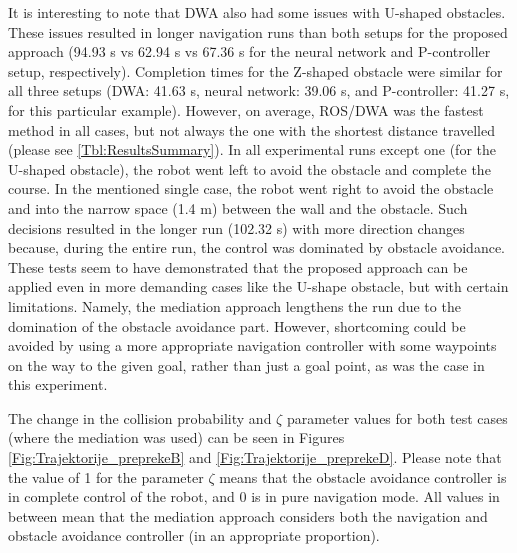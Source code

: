 It is interesting to note that DWA also had some issues with U-shaped obstacles. These issues resulted in longer navigation runs than both setups for the proposed approach (94.93 s vs 62.94 s vs 67.36 s for the neural network and P-controller setup, respectively). Completion times for the Z-shaped obstacle were similar for all three setups (DWA: 41.63 s, neural network: 39.06 s, and P-controller: 41.27 s, for this particular example). However, on average, ROS/DWA was the fastest method in all cases, but not always the one with the shortest distance travelled (please see \cref{Tbl:ResultsSummary}). In all experimental runs except one (for the U-shaped obstacle), the robot went left to avoid the obstacle and complete the course. In the mentioned single case, the robot went right to avoid the obstacle and into the narrow space (1.4 m) between the wall and the obstacle. Such decisions resulted in the longer run (102.32 s) with more direction changes because, during the entire run, the control was dominated by obstacle avoidance. These tests seem to have demonstrated that the proposed approach can be applied even in more demanding cases like the U-shape obstacle, but with certain limitations. Namely, the mediation approach lengthens the run due to the domination of the obstacle avoidance part. However, shortcoming could be avoided by using a more appropriate navigation controller with some waypoints on the way to the given goal, rather than just a goal point, as was the case in this experiment.

The change in the collision probability and $\zeta$ parameter values for both test cases (where the mediation was used) can be seen in Figures \ref{Fig:Trajektorije_preprekeB} and \ref{Fig:Trajektorije_preprekeD}. Please note that the value of 1 for the parameter $\zeta$ means that the obstacle avoidance controller is in complete control of the robot, and 0 is in pure navigation mode. All values in between mean that the mediation approach considers both the navigation and obstacle avoidance controller (in an appropriate proportion).

